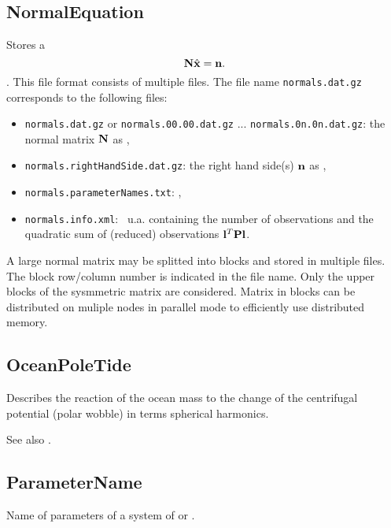 \subsection{NormalEquation}\label{general.fileFormat:normalEquation}
Stores a 
\begin{equation}
  \mathbf{N} \hat{\mathbf{x}} = \mathbf{n}.
\end{equation}.
This file format consists of multiple files.
The file name \verb|normals.dat.gz| corresponds to the following files:
\begin{itemize}
\item \verb|normals.dat.gz| or \verb|normals.00.00.dat.gz| ... \verb|normals.0n.0n.dat.gz|:
      the normal matrix $\mathbf{N}$ as ,
\item \verb|normals.rightHandSide.dat.gz|:
      the right hand side(s) $\mathbf{n}$ as ,
\item \verb|normals.parameterNames.txt|: ,
\item \verb|normals.info.xml|:
\     u.a. containing the number of observations and the quadratic sum of (reduced) observations $\mathbf{l}^T\mathbf{P}\mathbf{l}$.
\end{itemize}
A large normal matrix may be splitted into blocks and stored in multiple files.
The block row/column number is indicated in the file name.
Only the upper blocks of the sysmmetric matrix are considered.
Matrix in blocks can be distributed on muliple nodes in parallel mode to efficiently use distributed memory.


\subsection{OceanPoleTide}\label{general.fileFormat:oceanPoleTide}
Describes the reaction of the ocean mass to the change
of the centrifugal potential (polar wobble) in terms spherical harmonics.

See also .


\subsection{ParameterName}\label{general.fileFormat:parameterName}
Name of parameters of a system of  or .

